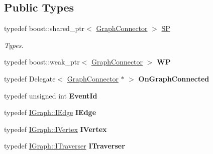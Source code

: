 \subsection*{Public Types}
\begin{DoxyCompactItemize}
\item 
\mbox{\label{class_graph_connector_a3c3f82646276f8b77083b5383a543480}} 
typedef boost\+::shared\+\_\+ptr$<$ \hyperlink{class_graph_connector}{Graph\+Connector} $>$ \hyperlink{class_graph_connector_a3c3f82646276f8b77083b5383a543480}{SP}
\begin{DoxyCompactList}\small\item\em Types. \end{DoxyCompactList}\item 
\mbox{\label{class_graph_connector_ad4f6d8d2172b22fc4db5a6a4470a972c}} 
typedef boost\+::weak\+\_\+ptr$<$ \hyperlink{class_graph_connector}{Graph\+Connector} $>$ {\bfseries WP}
\item 
\mbox{\label{class_graph_connector_a5303b1d359e39a15c5a726bdf6630332}} 
typedef Delegate$<$ \hyperlink{class_graph_connector}{Graph\+Connector} $\ast$ $>$ {\bfseries On\+Graph\+Connected}
\item 
\mbox{\label{class_graph_connector_a666f857aff32428c54227a02daf593a1}} 
typedef unsigned int {\bfseries Event\+Id}
\item 
\mbox{\label{class_graph_connector_aed06f194cfc6612a7f52785e5a9698a7}} 
typedef \hyperlink{class_i_graph_1_1_i_edge}{I\+Graph\+::\+I\+Edge} {\bfseries I\+Edge}
\item 
\mbox{\label{class_graph_connector_a2c03a4770fe9d2dc006d30f17909c022}} 
typedef \hyperlink{class_i_graph_1_1_i_vertex}{I\+Graph\+::\+I\+Vertex} {\bfseries I\+Vertex}
\item 
\mbox{\label{class_graph_connector_a36d2760a5143860b2500363745a2fc08}} 
typedef \hyperlink{class_i_graph_1_1_i_traverser}{I\+Graph\+::\+I\+Traverser} {\bfseries I\+Traverser}
\end{DoxyCompactItemize}
